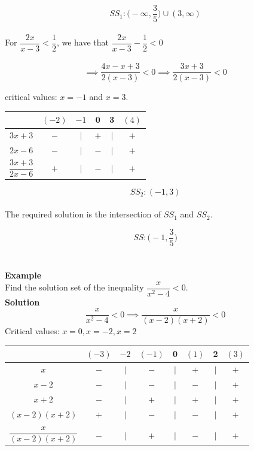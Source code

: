 \documentclass[11pt,a4paper]{article}
\begin{document}
$$SS_1:\bigg(-\infty,\frac{3}{5}\bigg)\cup (3,\infty)$$\\


For $\dfrac{2x}{x-3}<\dfrac{1}{2}$, we have that $\dfrac{2x}{x-3}-\dfrac{1}{2}<0$\\\\

$$\implies \frac{4x-x+3}{2(x-3)}<0\implies \frac{3x+3}{2(x-3)}<0$$

critical values: $x=-1$ and $x=3$.\\

\begin{table}[H]
\centering
\begin{tabular}{cccccc}
& $(-2)$ & $-1$ & 0 & 3 & $(4)$\\
\hline
\multicolumn{1}{c|}{$3x+3$}  & $-$ & $|$ & $+$ & $|$ & $+$\\
\multicolumn{1}{c|}{$2x-6$}  & $-$ & $|$ & $-$ & $|$ & $+$\\
\multicolumn{1}{c|}{$\dfrac{3x+3}{2x-6}$} & $+$ & $|$ & $-$ & $|$ & $+$\\
\end{tabular}
\end{table}


$$SS_2:(-1,3)$$\\

The required solution is the intersection of $SS_1$ and $SS_2$.

$$SS:\bigg(-1,\frac{3}{5}\bigg)$$\\\\






\textbf{Example}\\
Find the solution set of the inequality $\dfrac{x}{x^2-4}<0$.\\

\textbf{Solution}
$$\frac{x}{x^2-4}<0\implies \frac{x}{(x-2)(x+2)}<0$$
Critical values: $x=0, x=-2, x=2$

\begin{table}[H]
\centering
\begin{tabular}{cccccccc}
& $(-3)$ & $-2$ & $(-1)$ & 0 & $(1)$ & 2 & $(3)$\\
\hline
\multicolumn{1}{c|}{$x$} & $-$ & $|$ & $-$ & $|$ & $+$ & $|$ & $+$\\
\multicolumn{1}{c|}{$x-2$} & $-$ & $|$ & $-$ & $|$ & $-$ & $|$ & $+$\\
\multicolumn{1}{c|}{$x+2$} & $-$ & $|$ & $+$ & $|$ & $+$ & $|$ & $+$\\
\multicolumn{1}{c|}{$(x-2)(x+2)$} & $+$& $|$ & $-$ & $|$ & $-$ & $|$ & $+$\\
\multicolumn{1}{c|}{}&&&&&&&\\
\multicolumn{1}{c|}{$\dfrac{x}{(x-2)(x+2)}$} & $-$ & $|$ & $+$ & $|$ & $-$ & $|$ & $+$\\
\end{tabular}
\end{table}
\end{document}
